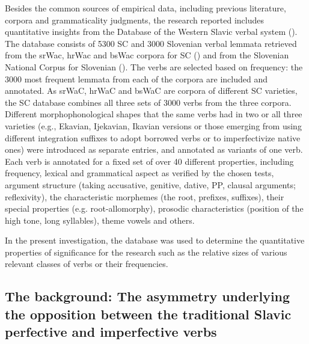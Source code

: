 \documentclass[output=paper]{langscibook}
\begin{document}
Besides the common sources of empirical data, including previous literature, corpora and grammaticality judgments, the research reported includes quantitative insights from the Database of the Western Slavic verbal system (\cite{Arsetal.2021}). The database consists of 5300 SC and 3000 Slovenian verbal lemmata retrieved from the srWac, hrWac and bsWac corpora for SC (\cite{Ljube.2011}) and from the Slovenian National Corpus for Slovenian (\cite{SloCorp}). The verbs are selected based on frequency: the 3000 most frequent lemmata from each of the corpora are included and annotated. As srWaC, hrWaC and bsWaC are corpora of different SC varieties, the SC database combines all three sets of 3000 verbs from the three corpora. Different morphophonological shapes that the same verbs had in two or all three varieties (e.g., Ekavian, Ijekavian, Ikavian versions or those emerging from using different integration suffixes to adopt borrowed verbs or to imperfectivize native ones) were introduced as separate entries, and annotated as variants of one verb. Each verb is annotated for a fixed set of over 40 different properties, including frequency, lexical and grammatical aspect as verified by the chosen tests, argument structure (taking accusative, genitive, dative, PP, clausal arguments; reflexivity), the characteristic morphemes (the root, prefixes, suffixes), their special properties (e.g. root-allomorphy), prosodic characteristics (position of the high tone, long syllables), theme vowels and others.

In the present investigation, the database was used to determine the quantitative properties of significance for the research such as the relative sizes of various relevant classes of verbs or their frequencies.

\subsection{The background: The asymmetry underlying the opposition between the traditional Slavic perfective and imperfective verbs}\label{ars:sec:Background}\largerpage
\end{document}
